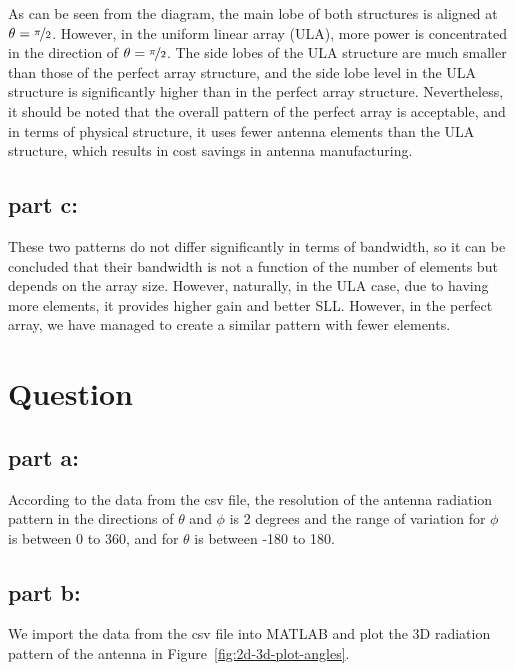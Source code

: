 \documentclass[12pt,onecolumn,a4paper]{article}
\newcommand\question{
	\section{Question \numberstringnum{\thesection}}
}
\begin{document}
	
	As can be seen from the diagram, the main lobe of both structures is aligned at $\theta = \nicefrac{\pi}{2}$. However, in the uniform linear array (ULA), more power is concentrated in the direction of $\theta = \nicefrac{\pi}{2}$. The side lobes of the ULA structure are much smaller than those of the perfect array structure, and the side lobe level in the ULA structure is significantly higher than in the perfect array structure. Nevertheless, it should be noted that the overall pattern of the perfect array is acceptable, and in terms of physical structure, it uses fewer antenna elements than the ULA structure, which results in cost savings in antenna manufacturing.
	
	
	
	\subsection{part c:}
	These two patterns do not differ significantly in terms of bandwidth, so it can be concluded that their bandwidth is not a function of the number of elements but depends on the array size. However, naturally, in the ULA case, due to having more elements, it provides higher gain and better SLL.
	However, in the perfect array, we have managed to create a similar pattern with fewer elements.
	
	
	\FloatBarrier\question%
	
	
	\FloatBarrier
	\subsection{part a:}
	According to the data from the csv file, the resolution of the antenna radiation pattern in the directions of $\theta$ and $\phi$ is 2 degrees and the range of variation for $\phi$ is between 0 to 360, and for $\theta$ is between -180 to 180.
	
	
	
	
	
	
	
	\FloatBarrier
	\subsection{part b:}
	
	We import the data from the csv file into MATLAB and plot the 3D radiation pattern of the antenna in Figure~\ref{fig:2d-3d-plot-angles}.
	
\end{document}
